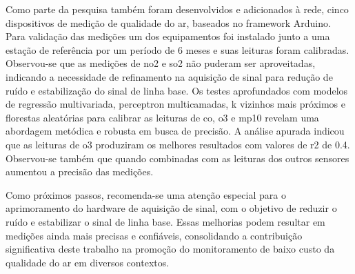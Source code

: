 Como parte da pesquisa também foram desenvolvidos e adicionados à rede, cinco dispositivos de medição de qualidade do ar, baseados no framework Arduino. Para validação das medições um dos equipamentos foi instalado junto a uma estação de referência por um período de 6 meses e suas leituras foram calibradas. Observou-se que as medições de \acrshort{no2} e \acrshort{so2} não puderam ser aproveitadas, indicando a necessidade de refinamento na aquisição de sinal para redução de ruído e estabilização do sinal de linha base. Os testes aprofundados com modelos de regressão multivariada, perceptron multicamadas, k vizinhos mais próximos e florestas aleatórias para calibrar as leituras de \acrshort{co}, \acrshort{o3} e \acrshort{mp10} revelam uma abordagem metódica e robusta em busca de precisão. A análise apurada indicou que as leituras de \acrshort{o3} produziram os melhores resultados com valores de r2 de 0.4. Observou-se também que quando combinadas com as leituras dos outros sensores aumentou a precisão das medições.

Como próximos passos, recomenda-se uma atenção especial para o aprimoramento do hardware de aquisição de sinal, com o objetivo de reduzir o ruído e estabilizar o sinal de linha base. Essas melhorias podem resultar em medições ainda mais precisas e confiáveis, consolidando a contribuição significativa deste trabalho na promoção do monitoramento de baixo custo da qualidade do ar em diversos contextos.
